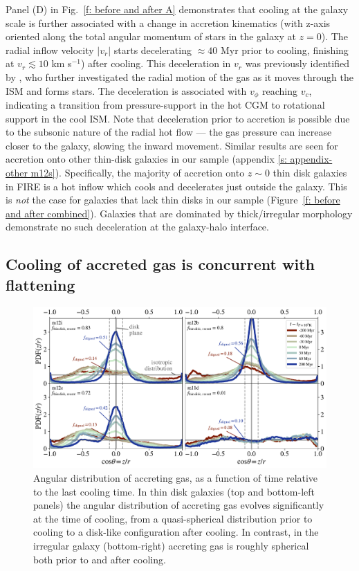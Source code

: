 \documentclass[fleqn,usenatbib]{mnras}
\begin{document}
Panel (D) in Fig.~\ref{f: before and after A} demonstrates that cooling at the galaxy scale is further associated with a change in accretion kinematics (with z-axis oriented along the total angular momentum of stars in the galaxy at $z=0$).
The radial inflow velocity $\vert v_r \vert $ starts decelerating $\approx40$ Myr prior to cooling, finishing at $v_{r} \lesssim10$ km s$^{-1}$) after cooling.
This deceleration in $v_r$ was previously identified by \citet{Trapp2021}, who further investigated the radial motion of the gas as it moves through the ISM and forms stars.
The deceleration is associated with $v_\phi$ reaching $v_c$, indicating a transition from pressure-support in the hot CGM to rotational support in the cool ISM.
Note that deceleration prior to accretion is possible due to the subsonic nature of the radial hot flow --- the gas pressure can increase closer to the galaxy, slowing the inward movement.
Similar results are seen for accretion onto other thin-disk galaxies in our sample (appendix \ref{s: appendix-other m12s}). 
Specifically, the majority of accretion onto $z\sim0$ thin disk galaxies in FIRE is a hot inflow which cools and decelerates just outside the galaxy.
This is {\em not} the case for galaxies that lack thin disks in our sample (Figure~\ref{f: before and after combined}).
Galaxies that are dominated by thick/irregular morphology demonstrate no such deceleration at the galaxy-halo interface.


\subsection{Cooling of accreted gas is concurrent with flattening}
\label{s: characteristics -- aligns}

\begin{figure}
    \centering
    \includegraphics[width=\textwidth]{figures/theta_vs_t.pdf}
    \caption{
    Angular distribution of accreting gas, as a function of time relative to the last cooling time.
    In thin disk galaxies (top and bottom-left panels) the angular distribution of accreting gas evolves significantly at the time of cooling, from a quasi-spherical distribution prior to cooling to a disk-like configuration after cooling. 
    In contrast, in the irregular galaxy (bottom-right) accreting gas is roughly spherical both prior to and after cooling.
    }
    \label{f: theta vs t}
\end{figure}
\end{document}
